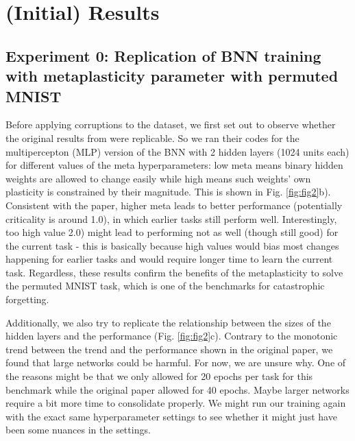 \documentclass[manuscript,screen,review]{acmart}
\begin{document}
\section{(Initial) Results}
\subsection{Experiment 0: Replication of BNN training with metaplasticity parameter with permuted MNIST
}

Before applying corruptions to the dataset, we first set out to observe whether the original results from \cite{Laborieux_Ernoult_Hirtzlin_Querlioz_2021} were replicable. So we ran their codes for the multipercepton (MLP) version of the BNN with 2 hidden layers (1024 units each) for different values of the meta hyperparameters: low meta means binary hidden weights are allowed to change easily while high means such weights’ own plasticity is constrained by their magnitude. This is shown in Fig. \ref{fig:fig2}b). Consistent with the paper, higher meta leads to better performance (potentially criticality is around 1.0), in which earlier tasks still perform well. Interestingly, too high value 2.0) might lead to performing not as well (though still good) for the current task - this is basically because high values would bias most changes happening for earlier tasks and would require longer time to learn the current task. Regardless, these results confirm the benefits of the metaplasticity to solve the permuted MNIST task, which is one of the benchmarks for catastrophic forgetting. 

Additionally, we also try to replicate the relationship between the sizes of the hidden layers and the performance (Fig. \ref{fig:fig2}c). Contrary to the monotonic trend between the trend and the performance shown in the original paper, we found that large networks could be harmful. For now, we are unsure why. One of the reasons might be that we only allowed for 20 epochs per task for this benchmark while the original paper allowed for 40 epochs. Maybe larger networks require a bit more time to consolidate properly. We might run our training again with the exact same hyperparameter settings to see whether it might just have been some nuances in the settings. 
\end{document}
